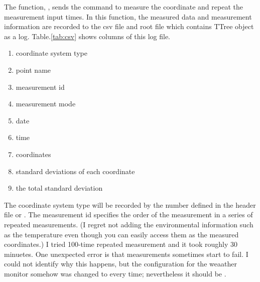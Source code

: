 \documentclass[a4paper,12pt]{article}  %
\begin{document}
The function, , sends the command to measure the coordinate and repeat the measurement input times.
In this function, the measured data and measurement information are recorded to the csv file and root file which contains TTree object as a log.
Table.\ref{tab:csv} shows columns of this log file.
\begin{center}
\begin{minipage}{0.5\textwidth}  %
  \centering
  \label{tab:csv}
  \begin{enumerate}
    \item coordinate system type
    \item point name
    \item measurement id
    \item measurement mode
    \item date
    \item time
    \item coordinates
    \item standard deviations of each coordinate
    \item the total standard deviation
  \end{enumerate}
\end{minipage}
\end{center}
The coordinate system type will be recorded by the number defined in the header file or .
The measurement id specifies the order of the measurement in a series of repeated measurements.
(I regret not adding the environmental information such as the temperature even though you can easily access them as the measured coordinates.)
I tried 100-time repeated measurement and it took roughly 30 minuetes.
One unexpected error is that measurements sometimes start to fail.
I could not identify why this happens, but the configuration for the weaather monitor somehow was changed to  every time; nevertheless it should be .
\end{document}
